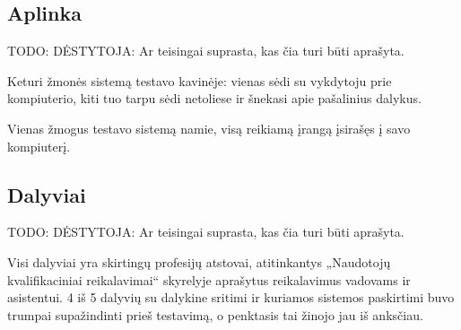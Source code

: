 
\subsection{Aplinka}

TODO: DĖSTYTOJA: Ar teisingai suprasta, kas čia turi būti aprašyta.

Keturi žmonės sistemą testavo kavinėje: vienas sėdi su vykdytoju prie
kompiuterio, kiti tuo tarpu sėdi netoliese ir šnekasi apie pašalinius
dalykus.

Vienas žmogus testavo sistemą namie, visą reikiamą įrangą įsirašęs į
savo kompiuterį.

\subsection{Dalyviai}

TODO: DĖSTYTOJA: Ar teisingai suprasta, kas čia turi būti aprašyta.

Visi dalyviai yra skirtingų profesijų atstovai, atitinkantys
„Naudotojų kvalifikaciniai reikalavimai“ skyrelyje aprašytus reikalavimus
vadovams ir asistentui. 4 iš 5 dalyvių su dalykine sritimi ir kuriamos
sistemos paskirtimi buvo trumpai supažindinti prieš testavimą, o
penktasis tai žinojo jau iš anksčiau.

